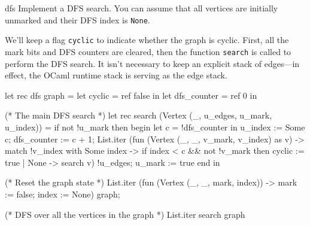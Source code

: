 \begin{exercise}{dfs}
Implement a DFS search.  You can assume that all vertices are initially unmarked and their DFS index
is \hbox{\lstinline/None/}.

\begin{answer}\ifanswers
We'll keep a flag \hbox{\lstinline/cyclic/} to indicate whether the graph is cyclic.  First, all the mark
bits and DFS counters are cleared, then the function \hbox{\lstinline/search/} is called to perform the DFS
search.  It isn't necessary to keep an explicit stack of edges---in effect, the OCaml runtime stack
is serving as the edge stack.

\begin{ocaml}
let rec dfs graph =
   let cyclic = ref false in
   let dfs_counter = ref 0 in

   (* The main DFS search *)
   let rec search (Vertex (_, u_edges, u_mark, u_index)) =
      if not !u_mark then begin
         let c = !dfs_counter in
         u_index := Some c;
         dfs_counter := c + 1;
         List.iter (fun (Vertex (_, _, v_mark, v_index) as v) ->
            match !v_index with
               Some index ->
                  if index < c && not !v_mark then
                     cyclic := true
             | None ->
                  search v) !u_edges;
         u_mark := true
      end
   in

   (* Reset the graph state *)
   List.iter (fun (Vertex (_, _, mark, index)) ->
      mark := false;
      index := None) graph;

   (* DFS over all the vertices in the graph *)
   List.iter search graph
\end{ocaml}
\fi\end{answer}
\end{exercise}

